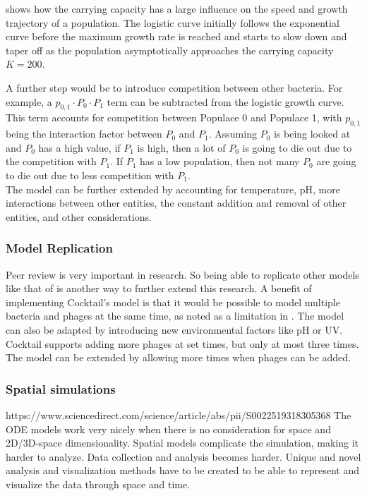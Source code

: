  shows how the carrying capacity has a large influence on the speed and growth trajectory of a population. 
The logistic curve initially follows the exponential curve before the maximum growth rate is reached and starts to slow down and taper off as the population asymptotically approaches the carrying capacity $K=200$. 

A further step would be to introduce competition between other bacteria. 
For example, a $p_{0, 1}\cdot P_0 \cdot P_1$ term can be subtracted from the logistic growth curve. 
This term accounts for competition between Populace 0 and Populace 1, with $p_{0, 1}$ being the interaction factor between $P_0$ and $P_1$. 
Assuming $P_0$ is being looked at and $P_0$ has a high value, if $P_1$ is high, then a lot of $P_0$ is going to die out due to the competition with $P_1$. 
If $P_1$ has a low population, then not many $P_0$ are going to die out due to less competition with $P_1$. \\ 

The model can be further extended by accounting for temperature, pH, more interactions between other entities, the constant addition and removal of other entities, and other considerations. 

\subsubsection{Model Replication}
Peer review is very important in research. 
So being able to replicate other models like that of \citet{nilssonCocktailComputerProgram2022} is another way to further extend this research. 
A benefit of implementing Cocktail's model is that it would be possible to model multiple bacteria and phages at the same time, as noted as a limitation in . 
The model can also be adapted by introducing new environmental factors like pH or UV. 
Cocktail supports adding more phages at set times, but only at most three times. 
The model can be extended by allowing more times when phages can be added. 

\subsubsection{Spatial simulations}
https://www.sciencedirect.com/science/article/abs/pii/S0022519318305368
The ODE models work very nicely when there is no consideration for space and 2D/3D-space dimensionality. 
Spatial models complicate the simulation, making it harder to analyze. 
Data collection and analysis becomes harder. 
Unique and novel analysis and visualization methods have to be created to be able to represent and visualize the data through space and time. 

